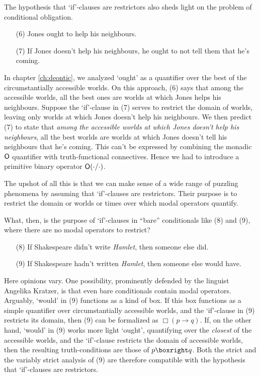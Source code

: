The hypothesis that `if'-clauses are restrictors also sheds light on the problem
of conditional obligation.
\begin{enumerate}[leftmargin=10mm]
  \itemsep-1mm  
  \item[(6)] Jones ought to help his neighbours.
  \item[(7)] If Jones doesn't help his neighbours, he ought to not tell them that he's coming.
\end{enumerate}
In chapter \ref{ch:deontic}, we analyzed `ought' as a quantifier over the best
of the circumstantially accessible worlds. On this approach, (6) says that among
the accessible worlds, all the best ones are worlds at which Jones helps his
neighbours. Suppose the `if'-clause in (7) serves to restrict the domain of
worlds, leaving only worlds at which Jones doesn't help his neighbours. We then
predict (7) to state that \emph{among the accessible worlds at which Jones
  doesn't help his neighbours}, all the best worlds are worlds at which Jones
doesn't tell his neighbours that he's coming. This can't be expressed by
combining the monadic $\operatorname{\mathsf{O}}$ quantifier with truth-functional connectives. Hence
we had to introduce a primitive binary operator $\operatorname{\mathsf{O}}(\cdot/\cdot)$.


The upshot of all this is that we can make sense of a wide range of puzzling
phenomena by assuming that `if'-clauses are restrictors. Their purpose is to
restrict the domain or worlds or times over which modal operators quantify.

What, then, is the purpose of `if'-clauses in ``bare'' conditionals like (8) and
(9), where there are no modal operators to restrict?
\begin{enumerate}[leftmargin=10mm]
  \itemsep-1mm
  \item[(8)] If Shakespeare didn't write \emph{Hamlet}, then someone else did.
  \item[(9)] If Shakespeare hadn't written \emph{Hamlet}, then someone else
        would have.
\end{enumerate}

Here opinions vary. One possibility, prominently defended by the linguist
Angelika Kratzer, is that even bare conditionals contain modal operators.
Arguably, `would' in (9) functions as a kind of box. If this box functions as a
simple quantifier over circumstantially accessible worlds, and the `if'-clause
in (9) restricts its domain, then (9) can be formalized as $\Box(p \to q)$. If,
on the other hand, `would' in (9) works more light `ought', quantifying over the
\emph{closest} of the accessible worlds, and the `if'-clause restricts the
domain of accessible worlds, then the resulting truth-conditions are those of
$p \boxright q$. Both the strict and the variably strict analysis of (9) are
therefore compatible with the hypothesis that `if'-clauses are restrictors.

